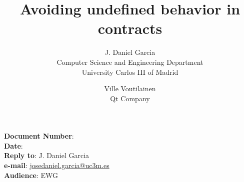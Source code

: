 \documentclass[12pt,a4paper,oneside,final,notitlepage]{article}%
\begin{document}


\noindent
\textbf{Document Number}: \texttt{\paperid}\\
\textbf{Date}: \paperdate\\
\textbf{Reply to}: J. Daniel Garcia\\ 
\textbf{e-mail}: \url{josedaniel.garcia@uc3m.es}\\
\textbf{Audience}: EWG\\

\title{Avoiding undefined behavior in contracts}
\author{J. Daniel Garcia\\
Computer Science and Engineering Department\\
University Carlos III of Madrid
\and
Ville Voutilainen\\
Qt Company
}
\date{}

\begingroup
\let\newpage\relax%
\maketitle
\endgroup





\end{document}
